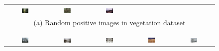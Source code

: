 \begin{figure}[th]
{{\begin{center}
\begin{tabular}{@{}c@{\,\,\,}c@{\,\,\,}c@{\,\,\,}c@{\,\,\,}c@{\,\,\,}}
\includegraphics[width=0.19\textwidth]{imggrid/datasetposi/8.jpg} &
\includegraphics[width=0.19\textwidth]{imggrid/datasetposi/9.jpg} &
\includegraphics[width=0.19\textwidth]{imggrid/datasetposi/10.jpg} \\
\multicolumn{5}{c}{(a) Random positive images in vegetation dataset} \\ 
\\[-6pt]
\hline
\\[-6pt]
\includegraphics[width=0.19\textwidth]{imggrid/datasetnega/1.jpg} &
\includegraphics[width=0.19\textwidth]{imggrid/datasetnega/2.jpg} &
\includegraphics[width=0.19\textwidth]{imggrid/datasetnega/3.jpg} &
\includegraphics[width=0.19\textwidth]{imggrid/datasetnega/4.jpg} &
\includegraphics[width=0.19\textwidth]{imggrid/datasetnega/5.jpg} \\

\end{tabular}
\end{center}}}
\end{figure}
